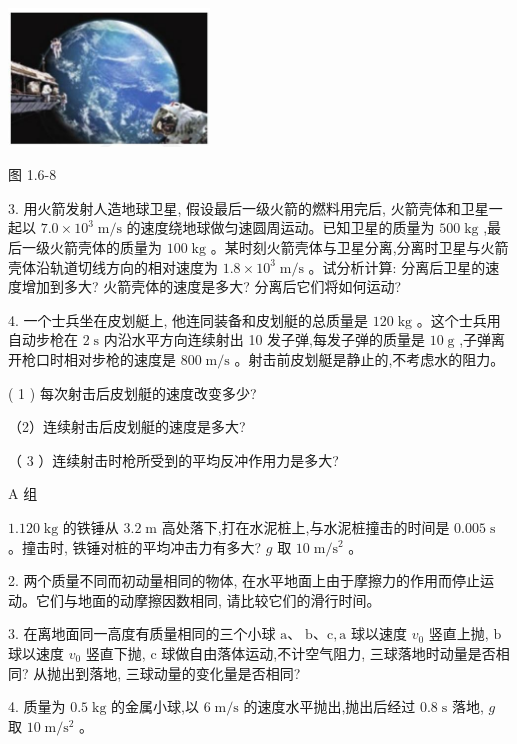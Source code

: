 \documentclass[10pt]{article}
\begin{document}
\begin{center}
\includegraphics[max width=0.4\textwidth]{images/01910e4c-ebb8-7d2c-8f2f-2375bc1d2d12_33_313653.jpg}
\end{center}

图 1.6-8

3. 用火箭发射人造地球卫星, 假设最后一级火箭的燃料用完后, 火箭壳体和卫星一起以 \({7.0} \times {10}^{3}\mathrm{\;m}/\mathrm{s}\) 的速度绕地球做匀速圆周运动。已知卫星的质量为 \({500}\mathrm{\;{kg}}\) ,最后一级火箭壳体的质量为 \({100}\mathrm{\;{kg}}\) 。某时刻火箭壳体与卫星分离,分离时卫星与火箭壳体沿轨道切线方向的相对速度为 \({1.8} \times {10}^{3}\mathrm{\;m}/\mathrm{s}\) 。试分析计算: 分离后卫星的速度增加到多大? 火箭壳体的速度是多大? 分离后它们将如何运动?

4. 一个士兵坐在皮划艇上, 他连同装备和皮划艇的总质量是 \({120}\mathrm{\;{kg}}\) 。这个士兵用自动步枪在 \(2\mathrm{\;s}\) 内沿水平方向连续射出 10 发子弹,每发子弹的质量是 \({10}\mathrm{\;g}\) ,子弹离开枪口时相对步枪的速度是 \({800}\mathrm{\;m}/\mathrm{s}\) 。射击前皮划艇是静止的,不考虑水的阻力。

( 1 ) 每次射击后皮划艇的速度改变多少?

（2）连续射击后皮划艇的速度是多大?

（ 3 ）连续射击时枪所受到的平均反冲作用力是多大?

A 组

\({1.120}\mathrm{\;{kg}}\) 的铁锤从 \({3.2}\mathrm{\;m}\) 高处落下,打在水泥桩上,与水泥桩撞击的时间是 \({0.005}\mathrm{\;s}\) 。撞击时, 铁锤对桩的平均冲击力有多大? \(g\) 取 \({10}\mathrm{\;m}/{\mathrm{s}}^{2}\) 。

2. 两个质量不同而初动量相同的物体, 在水平地面上由于摩擦力的作用而停止运动。它们与地面的动摩擦因数相同, 请比较它们的滑行时间。

3. 在离地面同一高度有质量相同的三个小球 \(\mathrm{a}\text{、}\mathrm{\;b}\text{、}\mathrm{c},\mathrm{a}\) 球以速度 \({v}_{0}\) 竖直上抛, \(\mathrm{b}\) 球以速度 \({v}_{0}\) 竖直下抛, \(\mathrm{c}\) 球做自由落体运动,不计空气阻力, 三球落地时动量是否相同? 从抛出到落地, 三球动量的变化量是否相同?

4. 质量为 \({0.5}\mathrm{\;{kg}}\) 的金属小球,以 \(6\mathrm{\;m}/\mathrm{s}\) 的速度水平抛出,抛出后经过 \({0.8}\mathrm{\;s}\) 落地, \(g\) 取 \({10}\mathrm{\;m}/{\mathrm{s}}^{2}\) 。
\end{document}
